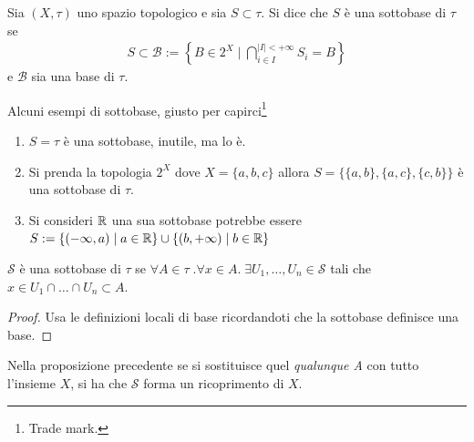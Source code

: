 \begin{definition}
	Sia $(X,\tau)$ uno spazio topologico e sia $S \subset \tau$. Si dice che $S$ è una sottobase di $\tau$ se 
	\begin{equation}
	\begin{aligned}
		S \subset \mathcal{B} := \left\{ B \in 2^X \; | \; \bigcap^{|I| < +\infty}_{i \in I} S_i = B \right\}
	\end{aligned}
	\end{equation}
	e $\mathcal{B}$ sia una base di $\tau$.
\end{definition}

Alcuni esempi di sottobase, giusto per capirci\footnote{Trade mark.}
\begin{enumerate}
	\item $S = \tau$ è una sottobase, inutile, ma lo è.
	\item Si prenda la topologia $2^X$ dove $X = \{a,b,c\}$ allora $S = \{\{a,b\},\{a,c\},\{c,b\}\}$ è una sottobase di $\tau$.
	\item Si consideri $\mathbb{R}$ una sua sottobase potrebbe essere $S := \{(-\infty, a) \; | \; a \in \mathbb{R}\} \cup \{(b, +\infty) \; | \; b \in \mathbb{R}\}$
\end{enumerate}

\begin{proposition}
	$\mathcal{S}$ è una sottobase di $\tau$ se $\forall A \in \tau \; . \forall x \in A . \; \exists U_1, \dots, U_n \in \mathcal{S}$ tali che $x \in U_1 \cap \dots \cap U_n \subset A$. 
\end{proposition}
\begin{proof}
	Usa le definizioni locali di base ricordandoti che la sottobase definisce una base.
\end{proof}

\begin{remark}
	Nella proposizione precedente se si sostituisce quel \textit{qualunque A} con tutto l'insieme $X$, si ha che $\mathcal{S}$ forma un ricoprimento di $X$.
\end{remark}

